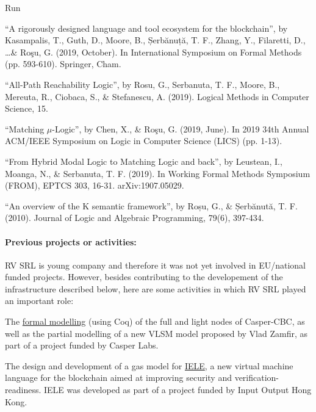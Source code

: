 \begin{sitedescription}{Run}
\begin{compactitem}
\item ``A rigorously designed language and tool ecosystem for the blockchain'', by Kasampalis, T., Guth, D., Moore, B., Șerbănuță, T. F., Zhang, Y., Filaretti, D., \ldots \& Roşu, G. (2019, October). In International Symposium on Formal Methods (pp. 593-610). Springer, Cham.
\item ``All-Path Reachability Logic'', by Rosu, G., Serbanuta, T. F., Moore, B., Mereuta, R., Ciobaca, S., \& Stefanescu, A. (2019). Logical Methods in Computer Science, 15.
\item ``Matching $\mu$-Logic'', by Chen, X., \& Roşu, G. (2019, June). In 2019 34th Annual ACM/IEEE Symposium on Logic in Computer Science (LICS) (pp. 1-13).
\item ``From Hybrid Modal Logic to Matching Logic and back'', by Leustean, I., Moanga, N., \& Serbanuta, T. F. (2019). In Working Formal Methods Symposium (FROM), EPTCS 303, 16-31. arXiv:1907.05029.
\item ``An overview of the K semantic framework'', by Roșu, G., \& Șerbănută, T. F. (2010).  Journal of Logic and Algebraic Programming, 79(6), 397-434.
\end{compactitem}

\paragraph*{Previous projects or activities:}


RV SRL is young company and therefore it was not yet involved in EU/national funded projects.
However, besides contributing to the developement of the infrastructure described below,
here are some activities in which RV SRL played an important role:
\begin{compactitem}
\item The \href{https://github.com/runtimeverification/casper-cbc-proofs}{formal modelling}
(using Coq) of the full and light nodes of Casper-CBC, as well as the partial
modelling of a new VLSM model proposed by Vlad Zamfir, as part of a
project funded by Casper Labs.
\item The design and development of a gas model for
\href{https://github.com/runtimeverification/iele-semantics}{IELE}, a new
virtual machine language for the blockchain aimed at improving security and
verification-readiness. IELE was developed as part of a project funded
by Input Output Hong Kong.
\end{compactitem}


\end{sitedescription}
